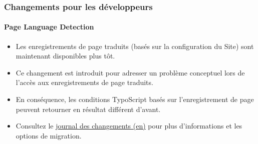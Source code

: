 %

\begin{frame}[fragile]
	\frametitle{Changements pour les développeurs}
	\framesubtitle{Page Language Detection}


	\begin{itemize}
		\item Les enregistrements de page traduits (basés sur la configuration du Site)
			sont maintenant disponibles plus tôt.
		\item Ce changement est introduit pour adresser un problème conceptuel lors de
			l'accès aux enregistrements de page traduits.
		\item En conséquence, les conditions TypoScript basés sur l'enregistrement de page
			peuvent retourner en résultat différent d'avant.
		\item Consultez le \href{https://docs.typo3.org/c/typo3/cms-core/master/en-us/Changelog/11.0/Breaking-23736-PageLanguageDetectionSetEarlierInFrontendRequestProcess.html}{journal des changements (en)}
			pour plus d'informations et les options de migration.
	\end{itemize}

\end{frame}

